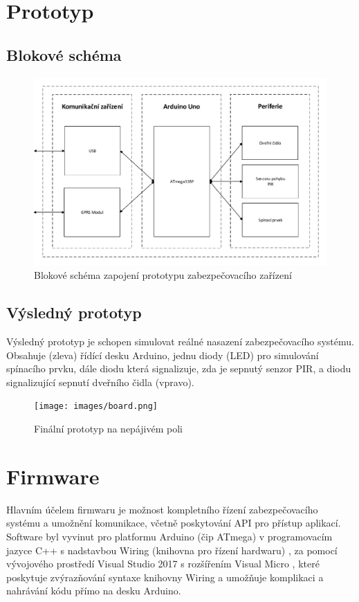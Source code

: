 \documentclass[FM,DP]{tulthesis}  %
\begin{document}
\section{Prototyp}

\subsection{Blokové schéma}

\begin{figure}[H]
\begin{center}
\includegraphics[width=\textwidth]{vector/blokoveSchemaHardware.pdf}
\caption{Blokové schéma zapojení prototypu zabezpečovacího zařízení}
\label{image}
\end{center}
\end{figure}

\subsection{Výsledný prototyp}
Výsledný prototyp je schopen simulovat reálné nasazení zabezpečovacího systému. Obsahuje (zleva) řídící desku Arduino, jednu diody (LED) pro simulování spínacího prvku, dále diodu která signalizuje, zda je sepnutý senzor PIR, a diodu signalizující sepnutí dveřního čidla (vpravo). 

\begin{figure}[H]
\begin{center}
\texttt{[image: images/board.png]}
\caption{Finální prototyp na nepájivém poli}
\label{image}
\end{center}
\end{figure}

\section{Firmware}
Hlavním účelem firmwaru je možnost kompletního řízení zabezpečovacího systému a umožnění komunikace, včetně poskytování API pro přístup aplikací. Software byl vyvinut pro platformu Arduino (čip ATmega) v programovacím jazyce C++ s nadstavbou Wiring (knihovna pro řízení hardwaru) \cite{Wiring}, za pomocí vývojového prostředí Visual Studio 2017 s rozšířením Visual Micro \cite{Visual Micro}, které poskytuje zvýrazňování syntaxe knihovny Wiring a umožňuje komplikaci a nahrávání kódu přímo na desku Arduino.
\end{document}
